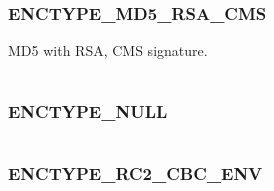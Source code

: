 \documentclass[letterpaper,10pt,english]{sphinxmanual}
\begin{document}
\begin{tabulary}{\linewidth}{|L|L|}
\hline

 & 
\\
\hline\end{tabulary}



\subsubsection{ENCTYPE\_MD5\_RSA\_CMS}
\label{appdev/refs/macros/ENCTYPE_MD5_RSA_CMS:enctype-md5-rsa-cms}\label{appdev/refs/macros/ENCTYPE_MD5_RSA_CMS:enctype-md5-rsa-cms-data}\label{appdev/refs/macros/ENCTYPE_MD5_RSA_CMS::doc}

\begin{fulllineitems}
\label{appdev/refs/macros/ENCTYPE_MD5_RSA_CMS:ENCTYPE_MD5_RSA_CMS}
\end{fulllineitems}


MD5 with RSA, CMS signature.

\begin{tabulary}{\linewidth}{|L|L|}
\hline

 & 
\\
\hline\end{tabulary}



\subsubsection{ENCTYPE\_NULL}
\label{appdev/refs/macros/ENCTYPE_NULL:enctype-null}\label{appdev/refs/macros/ENCTYPE_NULL::doc}\label{appdev/refs/macros/ENCTYPE_NULL:enctype-null-data}

\begin{fulllineitems}
\label{appdev/refs/macros/ENCTYPE_NULL:ENCTYPE_NULL}
\end{fulllineitems}


\begin{tabulary}{\linewidth}{|L|L|}
\hline

 & 
\\
\hline\end{tabulary}



\subsubsection{ENCTYPE\_RC2\_CBC\_ENV}
\label{appdev/refs/macros/ENCTYPE_RC2_CBC_ENV:enctype-rc2-cbc-env}\label{appdev/refs/macros/ENCTYPE_RC2_CBC_ENV::doc}\label{appdev/refs/macros/ENCTYPE_RC2_CBC_ENV:enctype-rc2-cbc-env-data}
\end{document}
